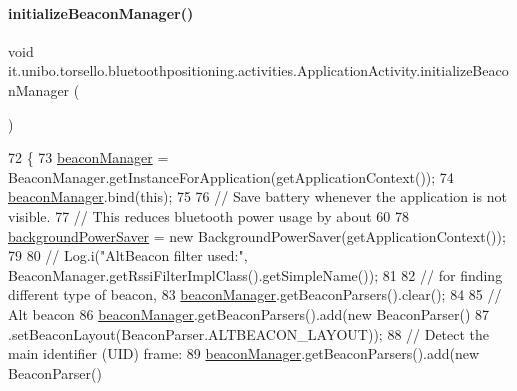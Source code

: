 \paragraph{\texorpdfstring{initialize\+Beacon\+Manager()}{initializeBeaconManager()}}
{\footnotesize\ttfamily void it.\+unibo.\+torsello.\+bluetoothpositioning.\+activities.\+Application\+Activity.\+initialize\+Beacon\+Manager (\begin{DoxyParamCaption}{ }\end{DoxyParamCaption})\hspace{0.3cm}{\ttfamily [private]}}


\begin{DoxyCode}
72                                            \{
73         \hyperlink{classit_1_1unibo_1_1torsello_1_1bluetoothpositioning_1_1activities_1_1ApplicationActivity_a973c37226a3dbba6016966c3555aff65_a973c37226a3dbba6016966c3555aff65}{beaconManager} = BeaconManager.getInstanceForApplication(getApplicationContext());
74         \hyperlink{classit_1_1unibo_1_1torsello_1_1bluetoothpositioning_1_1activities_1_1ApplicationActivity_a973c37226a3dbba6016966c3555aff65_a973c37226a3dbba6016966c3555aff65}{beaconManager}.bind(\textcolor{keyword}{this});
75 
76         \textcolor{comment}{// Save battery whenever the application is not visible.}
77         \textcolor{comment}{// This reduces bluetooth power usage by about 60%
78         \hyperlink{classit_1_1unibo_1_1torsello_1_1bluetoothpositioning_1_1activities_1_1ApplicationActivity_a85885639575161f4d73d4fc788f44ace_a85885639575161f4d73d4fc788f44ace}{backgroundPowerSaver} = \textcolor{keyword}{new} BackgroundPowerSaver(getApplicationContext());
79 
80 \textcolor{comment}{//        Log.i("AltBeacon filter used:", BeaconManager.getRssiFilterImplClass().getSimpleName());}
81 
82         \textcolor{comment}{// for finding different type of beacon,}
83         \hyperlink{classit_1_1unibo_1_1torsello_1_1bluetoothpositioning_1_1activities_1_1ApplicationActivity_a973c37226a3dbba6016966c3555aff65_a973c37226a3dbba6016966c3555aff65}{beaconManager}.getBeaconParsers().clear();
84 
85         \textcolor{comment}{// Alt beacon}
86         \hyperlink{classit_1_1unibo_1_1torsello_1_1bluetoothpositioning_1_1activities_1_1ApplicationActivity_a973c37226a3dbba6016966c3555aff65_a973c37226a3dbba6016966c3555aff65}{beaconManager}.getBeaconParsers().add(\textcolor{keyword}{new} BeaconParser()
87                 .setBeaconLayout(BeaconParser.ALTBEACON\_LAYOUT));
88         \textcolor{comment}{// Detect the main identifier (UID) frame:}
89         \hyperlink{classit_1_1unibo_1_1torsello_1_1bluetoothpositioning_1_1activities_1_1ApplicationActivity_a973c37226a3dbba6016966c3555aff65_a973c37226a3dbba6016966c3555aff65}{beaconManager}.getBeaconParsers().add(\textcolor{keyword}{new} BeaconParser()
}
\end{DoxyCode}
